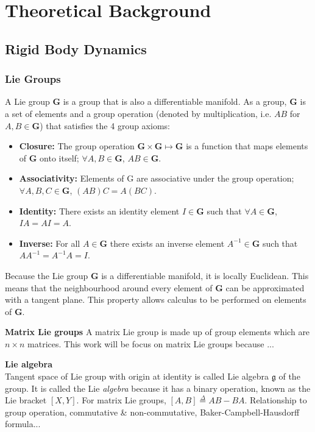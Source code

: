\section{Theoretical Background}

\subsection{Rigid Body Dynamics}
	\subsubsection{Lie Groups}		
		A Lie group $\mathbf{G}$ is a group that is also a differentiable manifold.
		As a group, $\mathbf{G}$ is a set of elements and a group operation (denoted by multiplication, i.e. $AB$ for $A,B \in \mathbf{G}$) that satisfies the 4 group axioms:
		
		\begin{itemize}
		\item \textbf{Closure:} 
			The group operation
			$\mathbf{G} \times \mathbf{G} \mapsto \mathbf{G}$ 
			is a function that maps elements of $\mathbf{G}$ onto itself;
			$\forall A,B \in \mathbf{G}$, $AB \in \mathbf{G}$.
		\item \textbf{Associativity:} Elements of G are associative under the group operation;
			$\forall A,B,C \in \mathbf{G}$, $(AB)C=A(BC)$.
		\item \textbf{Identity:} There exists an identity element $I \in \mathbf{G}$  such that
			$\forall A \in \mathbf{G}$, $IA = AI = A$.
		\item \textbf{Inverse:} For all $A \in \mathbf{G}$ there exists an inverse element $A^{-1} \in \mathbf{G}$ such that $AA^{-1}=A^{-1}A=I$. 
		\end{itemize}
		
		Because the Lie group $\mathbf{G}$ is a differentiable manifold, it is locally Euclidean. This means that the neighbourhood around every element of $\mathbf{G}$ can be approximated with a tangent plane. This property allows calculus to be performed on elements of $\mathbf{G}$.
		
		\textbf{Matrix Lie groups}
		A matrix Lie group is made up of group elements which are $n \times n$ matrices.
		This work will be focus on matrix Lie groups because ... 
		
		\textbf{Lie algebra}\\
		Tangent space of Lie group with origin at identity is called Lie algebra $\mathfrak{g} $ of the group. It is called the Lie \textit{algebra} because it has a binary operation, known as the Lie bracket $[X,Y]$. For matrix Lie groups, $[A,B] \stackrel{\Delta}{=} AB-BA$. Relationship to group operation, commutative \& non-commutative, Baker-Campbell-Hausdorff formula...
		
